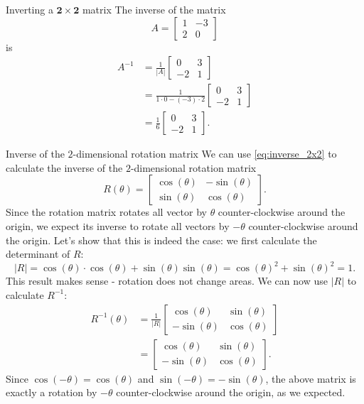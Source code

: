 \begin{example}{Inverting a $\bm{2\times2}$ matrix}{}
	The inverse of the matrix
	\[
		A = \begin{bmatrix}1&-3 \\ 2&0\end{bmatrix}
	\]
	is
	\begin{align*}
		A^{-1} &= \frac{1}{|A|}\begin{bmatrix}0&3 \\ -2&1\end{bmatrix}\\
			   &= \frac{1}{1\cdot0-(-3)\cdot2} \begin{bmatrix}0&3 \\ -2&1\end{bmatrix}\\
			   &= \frac{1}{6}\begin{bmatrix}0&3 \\ -2&1\end{bmatrix}.
	\end{align*}
\end{example}

\begin{example}{Inverse of the $2$-dimensional rotation matrix}{}
	We can use \autoref{eq:inverse_2x2} to calculate the inverse of the $2$-dimensional rotation matrix
	\[
		R \left( \theta \right) = \begin{bmatrix} \cos(\theta) & -\sin(\theta) \\ \sin(\theta) & \cos(\theta) \end{bmatrix}.
	\]
	Since the rotation matrix rotates all vector by $\theta$ counter-clockwise around the origin, we expect its inverse to rotate all vectors by $-\theta$ counter-clockwise around the origin. Let's show that this is indeed the case: we first calculate the determinant of $R$:
	\[
		|R| = \cos(\theta)\cdot\cos(\theta) + \sin(\theta)\sin(\theta) = \cos(\theta)^{2}+\sin(\theta)^{2} = 1.
	\]
	This result makes sense - rotation does not change areas. We can now use $|R|$ to calculate $R^{-1}$:
	\begin{align*}
		R^{-1} \left( \theta \right) &= \frac{1}{|R|}\begin{bmatrix} \cos(\theta) & \sin(\theta) \\ -\sin(\theta) & \cos(\theta)  \end{bmatrix}\\
									 &= \begin{bmatrix} \cos(\theta) & \sin(\theta) \\ -\sin(\theta) & \cos(\theta)  \end{bmatrix}. 
	\end{align*}
	Since $\cos(-\theta)=\cos(\theta)$ and $\sin(-\theta)=-\sin(\theta)$, the above matrix is exactly a rotation by $-\theta$ counter-clockwise around the origin, as we expected.
\end{example}

